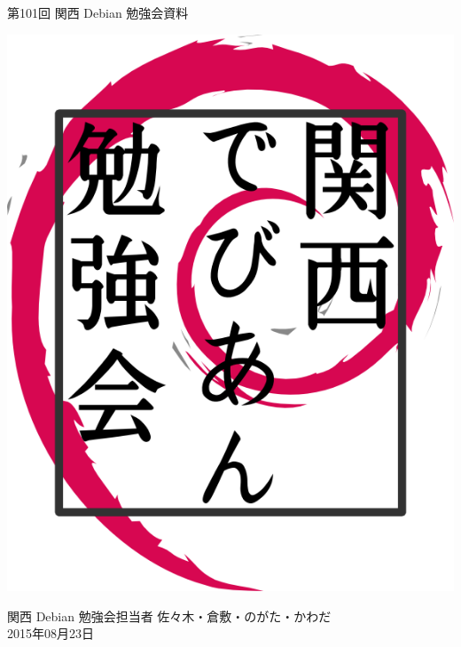 \documentclass[mingoth,a4paper]{jsarticle}
\newcommand{\debmtgyear}{2015}
\newcommand{\debmtgdate}{23}
\newcommand{\debmtgmonth}{08}
\newcommand{\debmtgnumber}{101}
\begin{document}
\begin{titlepage}


 第\debmtgnumber{}回 関西 Debian 勉強会資料

\vspace{2cm}

\begin{center}
\includegraphics{image200802/kansaidebianlogo.png}
\end{center}

\begin{flushright}
\hfill{}関西 Debian 勉強会担当者 佐々木・倉敷・のがた・かわだ \\
\hfill{}\debmtgyear{}年\debmtgmonth{}月\debmtgdate{}日
\end{flushright}

\thispagestyle{empty}
\end{titlepage}


\vspace{1em}
\end{document}
